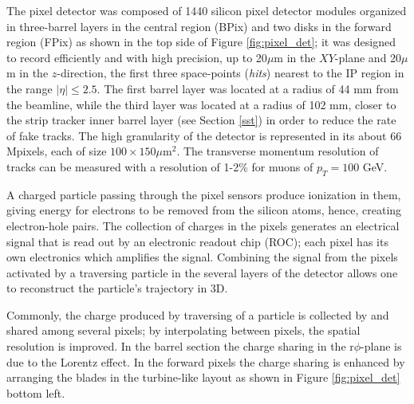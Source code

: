 The pixel detector was composed of 1440 silicon pixel detector modules organized in three-barrel layers in the central region (BPix) and two disks in the forward region (FPix) as shown in the top side of Figure \ref{fig:pixel_det}; it was designed to record efficiently and with high precision, up to 20$\mu$m in the $XY$-plane and 20$\mu$m in the $z$-direction, the first three space-points (\textit{hits}) nearest to the IP region in the range $|\eta|\leq 2.5$. The first barrel layer was located at a radius of 44 mm from the beamline, while the third layer was located at a radius of 102 mm, closer to the strip tracker inner barrel layer (see Section \ref{sst}) in order to reduce the rate of fake tracks. The high granularity of the detector is represented in its about 66 Mpixels, each of size $100\times150\mu$m$^2$. The transverse momentum resolution of tracks can be measured with a resolution of 1-2\% for muons of $p_T=100$ GeV. 

A charged particle passing through the pixel sensors produce ionization in them, giving energy for electrons to be removed from the silicon atoms, hence, creating electron-hole pairs. The collection of charges in the pixels generates an electrical signal that is read out by an electronic readout chip (ROC); each pixel has its own electronics which amplifies the signal. Combining the signal from the pixels activated by a traversing particle in the several layers of the detector allows one to reconstruct the particle's trajectory in 3D.

Commonly, the charge produced by traversing of a particle is collected by and shared among several pixels; by interpolating between pixels, the spatial resolution is improved. In the barrel section the charge sharing in the r$\phi$-plane is due to the Lorentz effect. In the forward pixels the charge sharing is enhanced by arranging the blades in the turbine-like layout as shown in Figure \ref{fig:pixel_det} bottom left.


